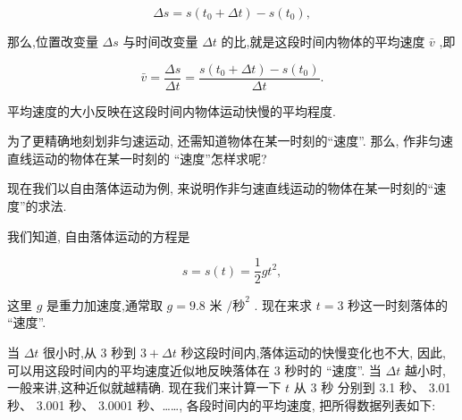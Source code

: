 \documentclass[10pt]{article}
\begin{document}
\[
{\Delta s} = s\left( {{t}_{0} + {\Delta t}}\right) - s\left( {t}_{0}\right) ,
\]

那么,位置改变量 \({\Delta s}\) 与时间改变量 \({\Delta t}\) 的比,就是这段时间内物体的平均速度 \(\bar{v}\) ,即

\[
\bar{v} = \frac{\Delta s}{\Delta t} = \frac{s\left( {{t}_{0} + {\Delta t}}\right) - s\left( {t}_{0}\right) }{\Delta t}.
\]

平均速度的大小反映在这段时间内物体运动快慢的平均程度.

为了更精确地刻划非匀速运动, 还需知道物体在某一时刻的“速度”. 那么, 作非匀速直线运动的物体在某一时刻的 “速度”怎样求呢?

现在我们以自由落体运动为例, 来说明作非匀速直线运动的物体在某一时刻的“速度”的求法.

我们知道, 自由落体运动的方程是

\[
s = s\left( t\right) = \frac{1}{2}g{t}^{2},
\]

这里 \(g\) 是重力加速度,通常取 \(g = {9.8}\) 米 \(/{\text{秒}}^{2}\) . 现在来求 \(t = 3\) 秒这一时刻落体的 “速度”.

当 \({\Delta t}\) 很小时,从 3 秒到 \(3 + {\Delta t}\) 秒这段时间内,落体运动的快慢变化也不大, 因此, 可以用这段时间内的平均速度近似地反映落体在 3 秒时的 “速度”. 当 \({\Delta t}\) 越小时,一般来讲,这种近似就越精确. 现在我们来计算一下 \(t\) 从 3 秒 分别到 3.1 秒、 3.01 秒、 3.001 秒、 3.0001 秒、……, 各段时间内的平均速度, 把所得数据列表如下:

\begin{center}
\end{center}
\end{document}
